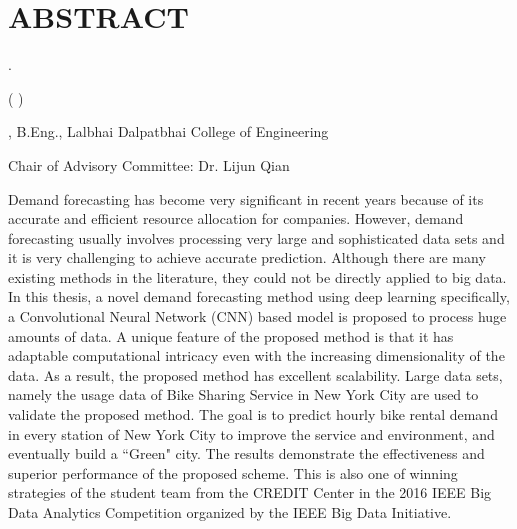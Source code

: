 %
%
%


\chapter*{ABSTRACT}

\thispagestyle{plain} %
\setcounter{page}{3}

\begin{center}

\pvamumanuscripttitle .

(\pvamugradmonth \hspace{2pt} \pvamugradyear)

\vspace{15pt}

\pvamufullname, B.Eng., Lalbhai Dalpatbhai College of Engineering

Chair of Advisory Committee: Dr. Lijun Qian

\par\end{center}

\justify

\indent 

	Demand forecasting has become very significant in recent years because of its accurate and efficient resource allocation for companies. However, demand forecasting usually involves processing very large and sophisticated data sets and it is very challenging to achieve accurate prediction. Although there are many existing methods in the literature, they could not be directly applied to big data. In this thesis, a novel demand forecasting method using deep learning specifically, a Convolutional Neural Network (CNN) based model is proposed to process huge amounts of data. A unique feature of the proposed method is that it has adaptable computational intricacy even with the increasing dimensionality of the data. As a result, the proposed method has excellent scalability. Large data sets, namely the usage data of Bike Sharing Service in New York City are used to validate the proposed method. The goal is to predict hourly bike rental demand in every station of New York City to improve the service and environment, and eventually build a ``Green" city. The results demonstrate the effectiveness and superior performance of the proposed scheme. This is also one of winning strategies of the student team from the CREDIT Center in the 2016 IEEE Big Data Analytics Competition organized by the IEEE Big Data Initiative.

